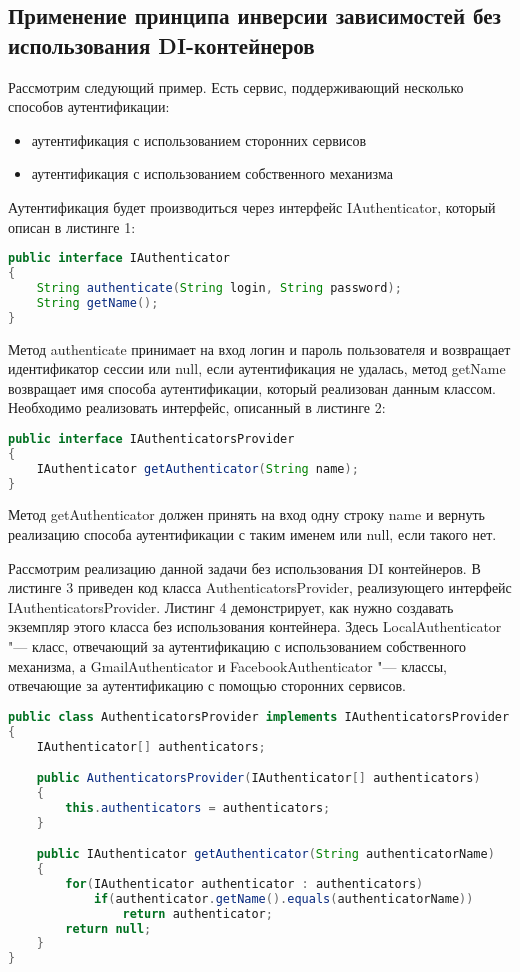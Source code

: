 \subsection{Применение принципа инверсии зависимостей без использования DI-контейнеров}

Рассмотрим следующий пример. Есть сервис, поддерживающий несколько способов аутентификации: 
\begin{itemize}
	\item аутентификация с использованием сторонних сервисов
	\item аутентификация с использованием собственного механизма
\end{itemize}
Аутентификация будет производиться через интерфейс IAuthenticator, который описан в листинге 1:

\begin{lstlisting}[language=Java,caption={IAuthenticator}]
public interface IAuthenticator
{
    String authenticate(String login, String password);
    String getName();
}
\end{lstlisting}

Метод authenticate принимает на вход логин и пароль пользователя и возвращает идентификатор сессии или null, если аутентификация не удалась, 
метод getName возвращает имя способа аутентификации, который реализован данным классом. Необходимо реализовать интерфейс, описанный в листинге 2:

\begin{lstlisting}[language=Java,caption={IAuthenticatorsProvider}]
public interface IAuthenticatorsProvider
{
    IAuthenticator getAuthenticator(String name);
}
\end{lstlisting}

Метод getAuthenticator должен принять на вход одну строку name и вернуть реализацию способа аутентификации с таким именем или null, если такого нет.

Рассмотрим реализацию данной задачи без использования DI контейнеров.
В листинге 3 приведен код класса AuthenticatorsProvider, реализующего интерфейс IAuthenticatorsProvider.
Листинг 4 демонстрирует, как нужно создавать экземпляр этого класса без использования контейнера. Здесь LocalAuthenticator "--- класс, отвечающий за аутентификацию с использованием
собственного механизма, а GmailAuthenticator и FacebookAuthenticator "--- классы, отвечающие за аутентификацию с помощью сторонних сервисов.


\begin{lstlisting}[language=Java,caption={Реализация интерфейса IAuthenticatorsProvider}]
public class AuthenticatorsProvider implements IAuthenticatorsProvider
{
    IAuthenticator[] authenticators;

    public AuthenticatorsProvider(IAuthenticator[] authenticators)
    {
        this.authenticators = authenticators;
    }

    public IAuthenticator getAuthenticator(String authenticatorName)
    {
        for(IAuthenticator authenticator : authenticators)
            if(authenticator.getName().equals(authenticatorName))
                return authenticator;
        return null;
    }
}
\end{lstlisting}

